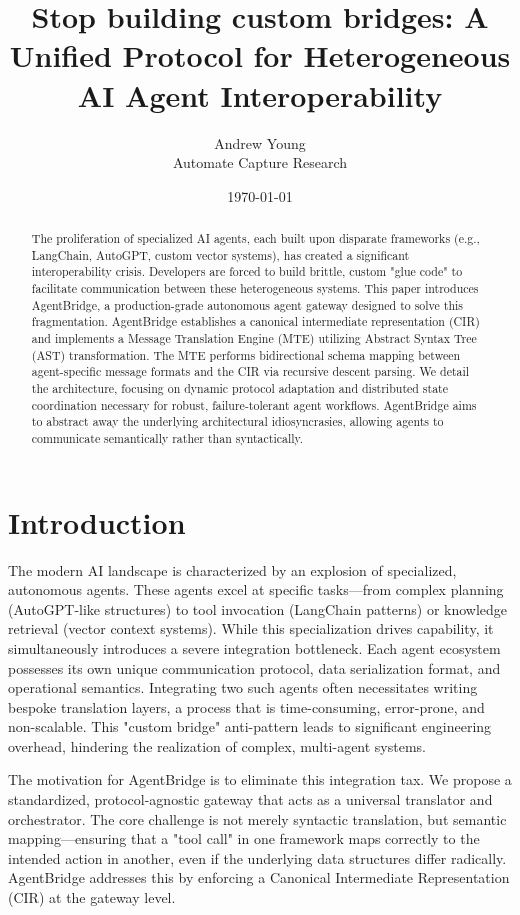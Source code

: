 \documentclass[11pt,a4paper]{article}
\title{Stop building custom bridges: A Unified Protocol for Heterogeneous AI Agent Interoperability}
\author{Andrew Young \\ Automate Capture Research}
\date{\today}
\begin{document}
\maketitle

\begin{abstract}
The proliferation of specialized AI agents, each built upon disparate frameworks (e.g., LangChain, AutoGPT, custom vector systems), has created a significant interoperability crisis. Developers are forced to build brittle, custom "glue code" to facilitate communication between these heterogeneous systems. This paper introduces AgentBridge, a production-grade autonomous agent gateway designed to solve this fragmentation. AgentBridge establishes a canonical intermediate representation (CIR) and implements a Message Translation Engine (MTE) utilizing Abstract Syntax Tree (AST) transformation. The MTE performs bidirectional schema mapping between agent-specific message formats and the CIR via recursive descent parsing. We detail the architecture, focusing on dynamic protocol adaptation and distributed state coordination necessary for robust, failure-tolerant agent workflows. AgentBridge aims to abstract away the underlying architectural idiosyncrasies, allowing agents to communicate semantically rather than syntactically.
\end{abstract}

\section{Introduction}
The modern AI landscape is characterized by an explosion of specialized, autonomous agents. These agents excel at specific tasks—from complex planning (AutoGPT-like structures) to tool invocation (LangChain patterns) or knowledge retrieval (vector context systems). While this specialization drives capability, it simultaneously introduces a severe integration bottleneck. Each agent ecosystem possesses its own unique communication protocol, data serialization format, and operational semantics. Integrating two such agents often necessitates writing bespoke translation layers, a process that is time-consuming, error-prone, and non-scalable. This "custom bridge" anti-pattern leads to significant engineering overhead, hindering the realization of complex, multi-agent systems.

The motivation for AgentBridge is to eliminate this integration tax. We propose a standardized, protocol-agnostic gateway that acts as a universal translator and orchestrator. The core challenge is not merely syntactic translation, but semantic mapping—ensuring that a "tool call" in one framework maps correctly to the intended action in another, even if the underlying data structures differ radically. AgentBridge addresses this by enforcing a Canonical Intermediate Representation (CIR) at the gateway level.
\end{document}
